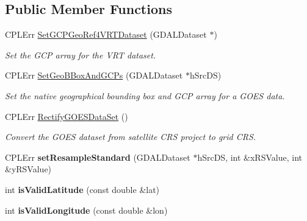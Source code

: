 \subsection*{Public Member Functions}
\begin{DoxyCompactItemize}
\item 
CPLErr \hyperlink{classNC__GOES__Dataset_afc729a63579f05daca3ebda085762026}{SetGCPGeoRef4VRTDataset} (GDALDataset $\ast$)
\begin{DoxyCompactList}\small\item\em Set the GCP array for the VRT dataset. \end{DoxyCompactList}\item 
CPLErr \hyperlink{classNC__GOES__Dataset_a2834229e8688e7ba0a8a135d8620d9a4}{SetGeoBBoxAndGCPs} (GDALDataset $\ast$hSrcDS)
\begin{DoxyCompactList}\small\item\em Set the native geographical bounding box and GCP array for a GOES data. \end{DoxyCompactList}\item 
CPLErr \hyperlink{classNC__GOES__Dataset_ae413433045908f2bd7d75a1c3c31fb03}{RectifyGOESDataSet} ()
\begin{DoxyCompactList}\small\item\em Convert the GOES dataset from satellite CRS project to grid CRS. \end{DoxyCompactList}\item 
\hypertarget{classNC__GOES__Dataset_ae16362490482905d96a92f6f09763601}{
CPLErr {\bfseries setResampleStandard} (GDALDataset $\ast$hSrcDS, int \&xRSValue, int \&yRSValue)}
\label{classNC__GOES__Dataset_ae16362490482905d96a92f6f09763601}

\item 
\hypertarget{classNC__GOES__Dataset_ae3546f1308a32fa402214b71d386a875}{
int {\bfseries isValidLatitude} (const double \&lat)}
\label{classNC__GOES__Dataset_ae3546f1308a32fa402214b71d386a875}

\item 
\hypertarget{classNC__GOES__Dataset_a5a32111ae54572d57812acb65cbce762}{
int {\bfseries isValidLongitude} (const double \&lon)}
\label{classNC__GOES__Dataset_a5a32111ae54572d57812acb65cbce762}


\end{DoxyCompactItemize}

